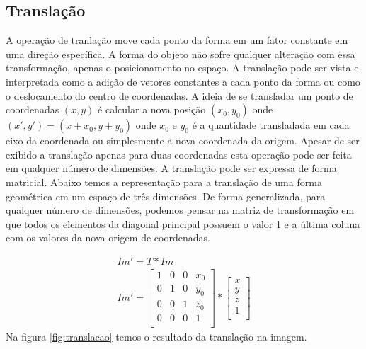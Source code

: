 \documentclass[
	article,			%
	11pt,				%
	oneside,			%
	a4paper,			%
	english,			%
	brazil,				%
	sumario=tradicional
	]{abntex2}
\begin{document}
\subsection{Translação}
A operação de tranlação move cada ponto da forma em um fator constante em uma
direção específica. A forma do objeto não sofre qualquer alteração com essa
transformação, apenas o posicionamento no espaço. A translação pode ser vista e
interpretada como a adição de vetores constantes a cada ponto da forma ou como o
deslocamento do centro de coordenadas.
A ideia de se transladar um ponto de coordenadas $(x,y)$ é calcular a nova
posição $(x_0,y_0)$ onde $(x',y')=(x+x_0,y+y_0)$ onde $x_0$ e $y_0$ é a
quantidade transladada em cada eixo da coordenada ou simplesmente a nova coordenada da
origem.
Apesar de ser exibido a translação apenas para duas coordenadas esta operação
pode ser feita em qualquer número de dimensões.
A translação pode ser expressa de forma matricial. Abaixo temos a representação
para a translação de uma forma geométrica em um espaço de três dimensões. De
forma generalizada, para qualquer número de dimensões, podemos pensar na matriz
de transformação em que todos os elementos da diagonal principal possuem o
valor 1 e a última coluna com os valores da nova origem de coordenadas.

\begin{align}
Im'=T*Im\\
Im'=\begin{bmatrix}
1 & 0 & 0 & x_0\\
0 & 1 & 0 & y_0\\
0 & 0 & 1 & z_0\\
0 & 0 & 0 & 1\\
\end{bmatrix}*
\begin{bmatrix}
x\\
y\\
z\\
1\\
\end{bmatrix}
\end{align}
Na figura \ref{fig:translacao} temos o resultado da translação na imagem.
\end{document}
